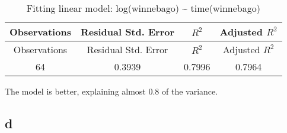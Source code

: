 \documentclass[]{book}
\theoremstyle{definition}
\theoremstyle{definition}
\theoremstyle{remark}
\begin{document}
\begin{longtable}[c]{@{}cccc@{}}
\caption{Fitting linear model: log(winnebago) \textasciitilde{}
time(winnebago)}\tabularnewline
\toprule
\begin{minipage}[b]{0.18\columnwidth}\centering\strut
Observations
\strut\end{minipage} &
\begin{minipage}[b]{0.27\columnwidth}\centering\strut
Residual Std. Error
\strut\end{minipage} &
\begin{minipage}[b]{0.10\columnwidth}\centering\strut
\(R^2\)
\strut\end{minipage} &
\begin{minipage}[b]{0.20\columnwidth}\centering\strut
Adjusted \(R^2\)
\strut\end{minipage}\tabularnewline
\midrule
\endfirsthead
\toprule
\begin{minipage}[b]{0.18\columnwidth}\centering\strut
Observations
\strut\end{minipage} &
\begin{minipage}[b]{0.27\columnwidth}\centering\strut
Residual Std. Error
\strut\end{minipage} &
\begin{minipage}[b]{0.10\columnwidth}\centering\strut
\(R^2\)
\strut\end{minipage} &
\begin{minipage}[b]{0.20\columnwidth}\centering\strut
Adjusted \(R^2\)
\strut\end{minipage}\tabularnewline
\midrule
\endhead
\begin{minipage}[t]{0.18\columnwidth}\centering\strut
64
\strut\end{minipage} &
\begin{minipage}[t]{0.27\columnwidth}\centering\strut
0.3939
\strut\end{minipage} &
\begin{minipage}[t]{0.10\columnwidth}\centering\strut
0.7996
\strut\end{minipage} &
\begin{minipage}[t]{0.20\columnwidth}\centering\strut
0.7964
\strut\end{minipage}\tabularnewline
\bottomrule
\end{longtable}

The model is better, explaining almost 0.8 of the variance.

\subsection*{d}\label{d-4}
\end{document}
